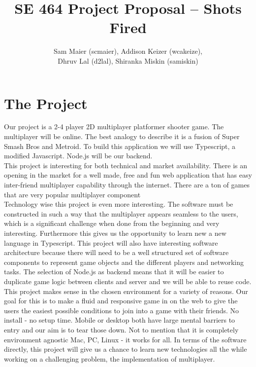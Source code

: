 \documentclass[11pt, oneside]{article}   	%
\title{SE 464 Project Proposal -- Shots Fired}
\author{Sam Maier (scmaier), Addison Keizer (wcakeize), \\Dhruv Lal (d2lal), Shiranka Miskin (samiskin)}
\begin{document}
\maketitle
\section{The Project}
\indent Our project is a 2-4 player 2D multiplayer platformer shooter game. The multiplayer will be online. The best analogy to describe it is a fusion of Super Smash Bros and Metroid. To build this application we will use Typescript, a modified Javascript. Node.js will be our backend. \\

This project is interesting for both technical and market availability. There is an opening in the market for a well made, free and fun web application that has easy inter-friend multiplayer capability through the internet. There are a ton of games that are very popular multiplayer component   \\

Technology wise this project is even more interesting. The software must be constructed in such a way that the multiplayer appears seamless to the users, which is a significant challenge when done from the beginning and very interesting. Furthermore this gives us the opportunity to learn new a new language in Typescript. This project will also have interesting software architecture because there will need to be a well structured set of software components to represent game objects and the different players and networking tasks. The selection of Node.js as backend means that it will be easier to duplicate game logic between clients and server and we will be able to reuse code. \\

This project makes sense in the chosen environment for a variety of reasons. Our goal for this is to make a fluid and responsive game in on the web to give the users the easiest possible conditions to join into a game with their friends. No install - no setup time. Mobile or desktop both have large mental barriers to entry and our aim is to tear those down. Not to mention that it is completely environment agnostic Mac, PC, Linux - it works for all. In terms of the software directly, this project will give us a chance to learn new technologies all the while working on a challenging problem, the implementation of multiplayer.  \\
\end{document}
